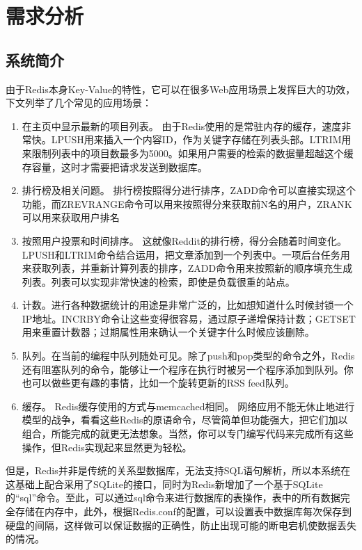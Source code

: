 \documentclass{zjutthesis}
\begin{document}
\chapter{需求分析}

\section{系统简介}
由于Redis本身Key-Value的特性，它可以在很多Web应用场景上发挥巨大的功效，下文列举了几个常见的应用场景：
\begin{enumerate}[label=（\arabic*）]
\item{在主页中显示最新的项目列表。
由于Redis使用的是常驻内存的缓存，速度非常快。LPUSH用来插入一个内容ID，作为关键字存储在列表头部。LTRIM用来限制列表中的项目数最多为5000。如果用户需要的检索的数据量超越这个缓存容量，这时才需要把请求发送到数据库。}

\item{排行榜及相关问题。
排行榜按照得分进行排序，ZADD命令可以直接实现这个功能，而ZREVRANGE命令可以用来按照得分来获取前N名的用户，ZRANK可以用来获取用户排名}

\item{按照用户投票和时间排序。
这就像Reddit的排行榜，得分会随着时间变化。LPUSH和LTRIM命令结合运用，把文章添加到一个列表中。一项后台任务用来获取列表，并重新计算列表的排序，ZADD命令用来按照新的顺序填充生成列表。列表可以实现非常快速的检索，即使是负载很重的站点。}

\item{计数。进行各种数据统计的用途是非常广泛的，比如想知道什么时候封锁一个IP地址。INCRBY命令让这些变得很容易，通过原子递增保持计数；GETSET用来重置计数器；过期属性用来确认一个关键字什么时候应该删除。}

\item{队列。在当前的编程中队列随处可见。除了push和pop类型的命令之外，Redis还有阻塞队列的命令，能够让一个程序在执行时被另一个程序添加到队列。你也可以做些更有趣的事情，比如一个旋转更新的RSS feed队列。}

\item{缓存。
Redis缓存使用的方式与memcached相同。
网络应用不能无休止地进行模型的战争，看看这些Redis的原语命令，尽管简单但功能强大，把它们加以组合，所能完成的就更无法想象。当然，你可以专门编写代码来完成所有这些操作，但Redis实现起来显然更为轻松。}
\end{enumerate}

但是，Redis并非是传统的关系型数据库，无法支持SQL语句解析，所以本系统在这基础上配合采用了SQLite的接口，同时为Redis新增加了一个基于SQLite的“sql”命令。至此，可以通过sql命令来进行数据库的表操作，表中的所有数据完全存储在内存中，此外，根据Redis.conf的配置，可以设置表中数据库每次保存到硬盘的间隔，这样做可以保证数据的正确性，防止出现可能的断电宕机使数据丢失的情况。
\end{document}
